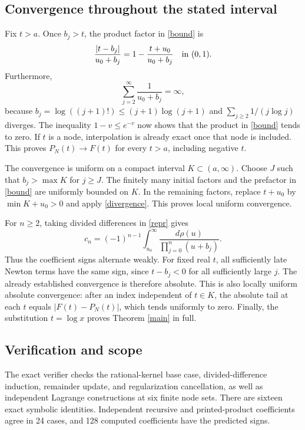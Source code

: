 \documentclass[11pt]{article}
\begin{document}
\subsection*{Convergence throughout the stated interval}
Fix $t>a$. Once $b_j>t$, the product factor in \eqref{bound} is
\[
 \frac{|t-b_j|}{u_0+b_j}
   =1-\frac{t+u_0}{u_0+b_j}\quad\hbox{in }(0,1).
\]
Furthermore,
\begin{equation}\label{divergence}
 \sum_{j=2}^\infty\frac1{u_0+b_j}=\infty,
\end{equation}
because $b_j=\log((j+1)!)\leq(j+1)\log(j+1)$ and
$\sum_{j\geq2}1/(j\log j)$ diverges. The inequality
$1-v\leq e^{-v}$ now shows that the product in \eqref{bound}
tends to zero. If $t$ is a node, interpolation is already exact
once that node is included. This proves $P_N(t)\to F(t)$ for
every $t>a$, including negative $t$.

The convergence is uniform on a compact interval $K\subset(a,\infty)$.
Choose $J$ such that $b_j>\max K$ for $j\geq J$.
The finitely many initial factors and the prefactor in
\eqref{bound} are uniformly bounded on $K$. In the remaining
factors, replace $t+u_0$ by $\min K+u_0>0$ and apply
\eqref{divergence}. This proves local uniform convergence.

For $n\geq2$, taking divided differences in \eqref{repr} gives
\begin{equation}\label{signcoef}
 c_n=(-1)^{n-1}
       \int_{u_0}^\infty\frac{d\rho(u)}
                              {\prod_{j=0}^n(u+b_j)}.
\end{equation}
Thus the coefficient signs alternate weakly. For fixed real $t$,
all sufficiently late Newton terms have the same sign, since
$t-b_j<0$ for all sufficiently large $j$. The already established
convergence is therefore absolute. This is also locally uniform
absolute convergence: after an index independent of $t\in K$,
the absolute tail at each $t$ equals $|F(t)-P_N(t)|$, which
tends uniformly to zero. Finally, the substitution $t=\log x$
proves Theorem \ref{main} in full.

\subsection*{Verification and scope}
The exact verifier checks the rational-kernel base case,
divided-difference induction, remainder update, and regularization
cancellation, as well as independent Lagrange constructions at
six finite node sets. There are sixteen exact symbolic identities.
Independent recursive and printed-product coefficients agree in
24 cases, and 128 computed coefficients have the predicted signs.
\end{document}
